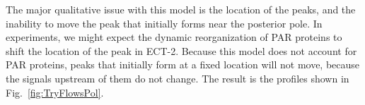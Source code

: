 \documentclass[11pt]{article}
\begin{document}
The major qualitative issue with this model is the location of the peaks, and the inability to move the peak that initially forms near the posterior pole. In experiments, we might expect the dynamic reorganization of PAR proteins to shift the location of the peak in ECT-2. Because this model does not account for PAR proteins, peaks that initially form at a fixed location will not move, because the signals upstream of them do not change. The result is the profiles shown in Fig.\ \ref{fig:TryFlowsPol}. 






\end{document}
